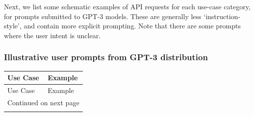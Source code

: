 \documentclass{article}
\begin{document}
Next, we list some schematic examples of API requests for each use-case category, for prompts submitted to GPT-3 models. These are generally less `instruction-style', and contain more explicit prompting. Note that there are some prompts where the user intent is unclear. 
\subsubsection{Illustrative user prompts from GPT-3 distribution}
\label{apdx:gpt3-prompts}

\begin{longtable}{p{} p{}}
\toprule
      Use Case &                                                                                                                                                                                                                                                                                        Example \\ \midrule
\midrule
\endfirsthead

\toprule
      Use Case &                                                                                                                                                                                                                                                                                        Example \\ \midrule
\midrule
\endhead
\midrule
\multicolumn{2}{r}{{Continued on next page}} \\ \midrule
\midrule
\endfoot


\end{longtable}
\end{document}
